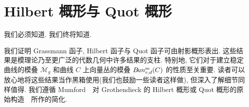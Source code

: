 \chapter{Hilbert 概形与 Quot 概形}\label{src:2}
\begin{epigraph}
我们必须知道. 我们终将知道.
\end{epigraph}
我们证明 Grassmann 函子, Hilbert 函子与 Quot 函子可由射影概形表出. 这些结果是模理论乃至更广泛的代数几何中许多结果的支柱. 特别地, 它们对于建立稳定曲线的模叠 $\overline{\mathcal M}_g$ 和曲线 $C$ 上向量丛的模叠 $B\!un_{r,d}^{\mathrm{ss}}(C)$ 的性质至关重要. 读者可以放心地将这些结果当作黑箱使用(我们也鼓励一些读者这样做), 但深入了解细节同样值得. 我们遵循 Mumford~\cite{Mum66a}~对 Grothendieck 的 Hilbert 概形或 Quot 概形的原始构造~\cite{FGAIV}~所作的简化.

